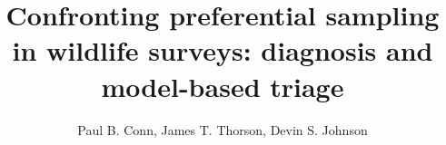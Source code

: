 \documentclass[times,mee,doublespace,]{besauth2}
\begin{document}


\title{Confronting preferential sampling in wildlife surveys: diagnosis and model-based triage \footnotemark[2]}

\author{Paul B. Conn\corrauth, James T. Thorson, Devin S. Johnson}


\address{National Marine Mammal Laboratory, Alaska Fisheries Science Center, NOAA National Marine Fisheries Service, 7600 Sand Point Way NE, Seattle, WA 98115 USA;  Fisheries Resource Assessment and Monitoring Division (FRAM), Northwest Fisheries Science Center, National Marine Fisheries Service (NMFS),
NOAA, 2725 Montlake Boulevard E, Seattle, WA 98112, USA}

\end{document}
